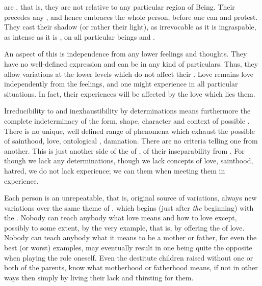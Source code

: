 \pa %
 are , that is, they are not relative to any
particular region of Being. Their  precedes any 
, and hence embraces the whole person, before one can 
and protest. They cast their shadow (or rather their light), as irrevocable as it is
ingraspable, as intense as it is , on all particular beings and
.

An aspect of this  is independence from any lower feelings and
thoughts. They have no well-defined expression and can be  in any
kind of particulars.  Thus, they allow variations at the lower levels which do
not affect their . Love remains love independently from the
feelings,  and  one might experience in all particular
situations. In fact, their experiences will be affected by the love which lies
  them.

Irreducibility to and inexhaustibility by  determinations means
furthermore the complete indeterminacy of the form, shape, character and context of
possible .  There is no unique, well defined range
of phenomena which exhaust the possible  of
sainthood, love, ontological , damnation. There are no 
criteria telling one from another.  This is just another side of the
 of , of their inseparability from
.  For though we lack any  determinations,
though we lack concepts of love, sainthood, hatred, we do not lack
experience; we can  them
when meeting them in experience.

\pa\label{pa:anamnesisB}
Each person is an unrepeatable, that is, original source of variations, always
new variations over the same theme of , which
begins (just after {\em the} beginning) with the .  Nobody can
teach anybody what love means and 
how to love except, possibly to some extent, by the very example, that is, by
offering the  of love.  Nobody can teach anybody what
it means to be a mother or father, for even the best (or worst) examples, may
eventually result in one being quite the opposite when 
playing the role oneself.  Even the destitute children raised without one
or both of the parents, know what motherhood or fatherhood means, if not in
other ways then simply by living their lack and thirsting for them.


